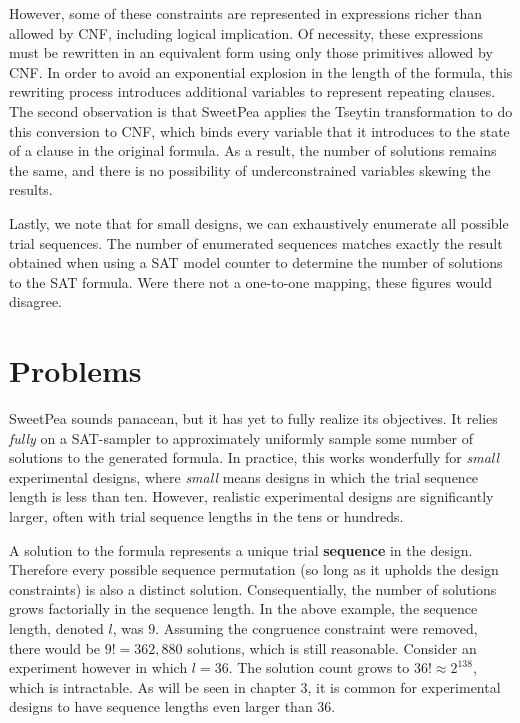 However, some of these constraints are represented in expressions richer than allowed by CNF, including logical implication. Of necessity, these expressions must be rewritten in an equivalent form using only those primitives allowed by CNF. In order to avoid an exponential explosion in the length of the formula, this rewriting process introduces additional variables to represent repeating clauses. The second observation is that SweetPea applies the Tseytin transformation to do this conversion to CNF, which binds every variable that it introduces to the state of a clause in the original formula. As a result, the number of solutions remains the same, and there is no possibility of underconstrained variables skewing the results.

Lastly, we note that for small designs, we can exhaustively enumerate all possible trial sequences. The number of enumerated sequences matches exactly the result obtained when using a SAT model counter to determine the number of solutions to the SAT formula. Were there not a one-to-one mapping, these figures would disagree.


\section{Problems}

SweetPea sounds panacean, but it has yet to fully realize its objectives. It relies \textit{fully} on a SAT-sampler to approximately uniformly sample some number of solutions to the generated formula. In practice, this works wonderfully for \textit{small} experimental designs, where \textit{small} means designs in which the trial sequence length is less than ten. However, realistic experimental designs are significantly larger, often with trial sequence lengths in the tens or hundreds.

A solution to the formula represents a unique trial \textbf{sequence} in the design. Therefore every possible sequence permutation (so long as it upholds the design constraints) is also a distinct solution. Consequentially, the number of solutions grows factorially in the sequence length. In the above example, the sequence length, denoted $l$, was $9$. Assuming the congruence constraint were removed, there would be $9! = 362,880$ solutions, which is still reasonable. Consider an experiment however in which $l = 36$. The solution count grows to $36! \approx 2^{138}$, which is intractable. As will be seen in chapter 3, it is common for experimental designs to have sequence lengths even larger than 36.

